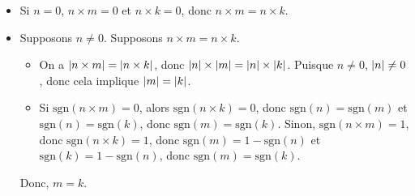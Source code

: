     \begin{itemize}[nosep]
        \item Si $n = 0$, $n \times m = 0$ et $n \times k = 0$, donc $n \times m = n \times k$.
        \item Supposons $n \neq 0$. 
            Supposons $n \times m = n \times k$.
            \begin{itemize}[nosep]
                \item On a $\left\lvert n \times m \right\rvert = \left\lvert n \times k \right\rvert$, donc $\left\lvert n \right\rvert \times \left\lvert m \right\rvert = \left\lvert n \right\rvert \times \left\lvert k \right\rvert$. 
                    Puisque $n \neq 0$, $\left\lvert n \right\rvert \neq 0$, donc cela implique $\left\lvert m \right\rvert = \left\lvert k \right\rvert$.
                \item Si $\mathrm{sgn}(n \times m) = 0$, alors $\mathrm{sgn}(n \times k) = 0$, donc $\mathrm{sgn}(n) = \mathrm{sgn}(m)$ et $\mathrm{sgn}(n) = \mathrm{sgn}(k)$, donc $\mathrm{sgn}(m) = \mathrm{sgn}(k)$.
                    Sinon, $\mathrm{sgn}(n \times m) = 1$, donc $\mathrm{sgn}(n \times k) = 1$, donc $\mathrm{sgn}(m) = 1 - \mathrm{sgn}(n)$ et $\mathrm{sgn}(k) = 1 - \mathrm{sgn}(n)$, donc $\mathrm{sgn}(m) = \mathrm{sgn}(k)$.
            \end{itemize}
            Donc, $m = k$.
            

\end{itemize}
